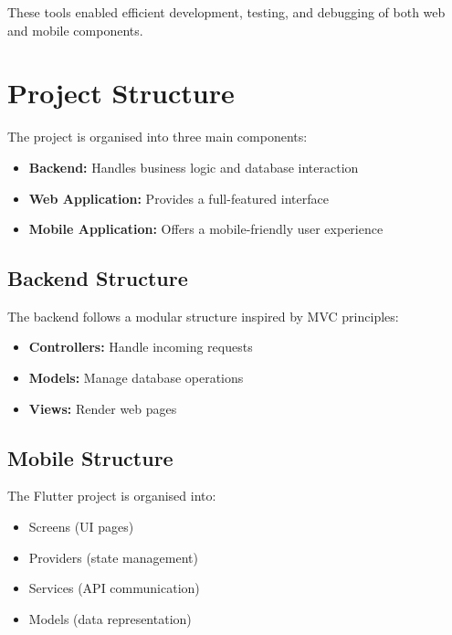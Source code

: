 These tools enabled efficient development, testing, and debugging of both web and mobile components.

\section{Project Structure}

The project is organised into three main components:

\begin{itemize}[noitemsep]
    \item \textbf{Backend:} Handles business logic and database interaction
    \item \textbf{Web Application:} Provides a full-featured interface
    \item \textbf{Mobile Application:} Offers a mobile-friendly user experience
\end{itemize}

\subsection{Backend Structure}

The backend follows a modular structure inspired by MVC principles:

\begin{itemize}[noitemsep]
    \item \textbf{Controllers:} Handle incoming requests
    \item \textbf{Models:} Manage database operations
    \item \textbf{Views:} Render web pages
\end{itemize}

\subsection{Mobile Structure}

The Flutter project is organised into:

\begin{itemize}[noitemsep]
    \item Screens (UI pages)
    \item Providers (state management)
    \item Services (API communication)
    \item Models (data representation)
\end{itemize}

